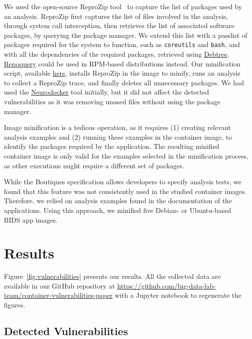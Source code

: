 \documentclass[a4paper,num-refs]{oup-contemporary}
\newcommand{\reprozip}[0]{ReproZip\xspace}
\newcommand{\revision}[1]{\color{ao(english)}#1\color{black}\xspace}
\begin{document}
We used the open-source \reprozip tool~\cite{rampin2016reprozip}
to capture the list of packages used by an analysis. \reprozip first
captures the list of files involved in the analysis, through system call
interception, then retrieves the list of associated software packages, by
querying the package manager. We extend this list with a passlist of
packages required for the system to function, such as \texttt{coreutils}
and \texttt{bash}, and with all the dependencies of the required packages,
retrieved using
\href{http://manpages.ubuntu.com/manpages/xenial/man1/debtree.1.html}{Debtree}.
\href{https://linux.die.net/man/1/repoquery}{Repoquery} could be used in
RPM-based distributions instead. Our minification script, available
\href{https://github.com/big-data-lab-team/container-vulnerabilities-paper/tree/master/Scripts/minification}{here},
installs \reprozip in the image to minify, runs an analysis to collect a
\reprozip trace, and finally deletes all unnecessary packages. We had used
the \href{https://github.com/ReproNim/neurodocker}{Neurodocker} tool
initially, but it did not affect the detected vulnerabilities
as it was removing unused files without using the package manager.

Image minification is a tedious operation\revision{, as it requires (1) creating
relevant analysis examples and (2) running these examples in the container
image}, to identify the packages required by the application. The
resulting \revision{minified} container image is only valid for the examples selected
in the minification process, as other executions might require a
different set of packages. 

\revision{While the Boutiques specification allows developers to 
specify analysis tests, we found that this feature was not consistently used in 
the studied container images. Therefore, we relied on analysis examples found in the 
documentation of the applications.   
Using this approach, we minified five Debian- or Ubuntu-based BIDS app images.}

\section{Results}

Figure~\ref{fig:vulnerabilities} presents our results. All the collected
data are available in our GitHub repository at
\url{https://github.com/big-data-lab-team/container-vulnerabilities-paper}
with a Jupyter notebook to regenerate the figures. 

\subsection{Detected Vulnerabilities}
\end{document}
